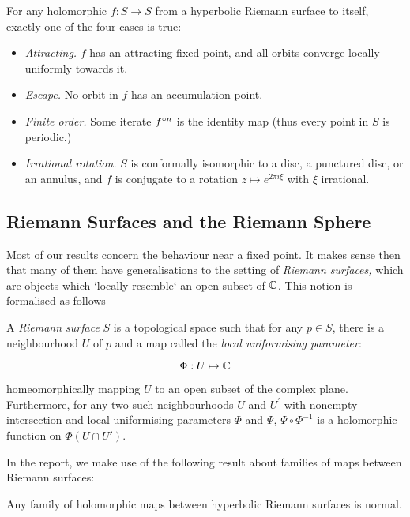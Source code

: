 \begin{thm}
\label{ax:thm:fatou-classification}
For any holomorphic $f : S \to S$ from a hyperbolic Riemann surface to itself, exactly one of the four cases is true:
\begin{itemize}
    \item \emph{Attracting.} $f$ has an attracting fixed point, and all orbits converge locally uniformly towards it.
    \item \emph{Escape.} No orbit in $f$ has an accumulation point.
    \item \emph{Finite order.} Some iterate $f^{\circ n}$ is the identity map (thus every point in $S$ is periodic.)
    \item \emph{Irrational rotation.} $S$ is conformally isomorphic to a disc, a punctured disc, or an annulus, and $f$ is conjugate to a rotation $z \mapsto e^{2 \pi i \xi}$ with $\xi$ irrational. 
\end{itemize}
\end{thm}

\subsection{Riemann Surfaces and the Riemann Sphere}
Most of our results concern the behaviour near a fixed point. It makes sense then that many of them have generalisations to the setting of \emph{Riemann surfaces,} which are objects which `locally resemble` an open subset of $\mathbb{C}$. This notion is formalised as follows

\begin{dfn}
\label{app:dfn:riemannsurfaces}

A \emph{Riemann surface} $S$ is a topological space such that for any $p \in S$, there is a neighbourhood $U$ of $p$ and a map called the \textit{local uniformising parameter}:

$$\Phi : U \mapsto \mathbb{C}$$

homeomorphically mapping $U$ to an open subset of the complex plane. Furthermore, for any two such neighbourhoods \(U\) and \(U^{\prime}\) with nonempty intersection and local uniformising parameters \(\Phi\) and \(\Psi\), \(\Psi \circ \Phi^{-1}\) is a holomorphic function on $\Phi(U \cap U')$.
\end{dfn}

In the report, we make use of the following result about families of maps between Riemann surfaces:
\begin{thm}[Montel]\label{ax:thm:montel}
Any family of holomorphic maps between hyperbolic Riemann surfaces is normal.
\end{thm}

